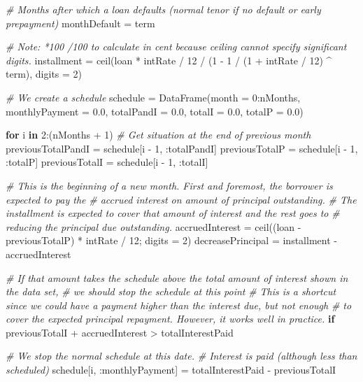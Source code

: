 \documentclass[11pt,]{report}
\newenvironment{Shaded}{\begin{snugshade}}{\end{snugshade}}
\newcommand{\CommentTok}[1]{\textcolor[rgb]{0.56,0.35,0.01}{\textit{#1}}}
\newcommand{\FloatTok}[1]{\textcolor[rgb]{0.00,0.00,0.81}{#1}}
\newcommand{\KeywordTok}[1]{\textcolor[rgb]{0.13,0.29,0.53}{\textbf{#1}}}
\newcommand{\NormalTok}[1]{#1}
\begin{document}
\begin{Shaded}
\begin{Highlighting}[numbers=left,,]
  \CommentTok{# Months after which a loan defaults (normal tenor if no default or early prepayment)}
\NormalTok{  monthDefault = term}

  \CommentTok{# Note: *100 /100 to calculate in cent because ceiling cannot specify significant digits.}
\NormalTok{  installment = ceil(loan * intRate / }\FloatTok{12}\NormalTok{ / (}\FloatTok{1}\NormalTok{ - }\FloatTok{1}\NormalTok{ / (}\FloatTok{1}\NormalTok{ + intRate / }\FloatTok{12}\NormalTok{) ^ term), digits = }\FloatTok{2}\NormalTok{)}

  \CommentTok{# We create a schedule}
\NormalTok{  schedule = DataFrame(month = }\FloatTok{0}\NormalTok{:nMonths, monthlyPayment = }\FloatTok{0.0}\NormalTok{,}
\NormalTok{                       totalPandI = }\FloatTok{0.0}\NormalTok{, totalI = }\FloatTok{0.0}\NormalTok{, totalP = }\FloatTok{0.0}\NormalTok{)}

  \KeywordTok{for}\NormalTok{ i }\KeywordTok{in} \FloatTok{2}\NormalTok{:(nMonths + }\FloatTok{1}\NormalTok{)}
    \CommentTok{# Get situation at the end of previous month}
\NormalTok{    previousTotalPandI = schedule[i - }\FloatTok{1}\NormalTok{, :totalPandI]}
\NormalTok{    previousTotalP     = schedule[i - }\FloatTok{1}\NormalTok{, :totalP]}
\NormalTok{    previousTotalI     = schedule[i - }\FloatTok{1}\NormalTok{, :totalI]}

    \CommentTok{# This is the beginning of a new month. First and foremost, the borrower is expected to pay the}
    \CommentTok{# accrued interest on amount of principal outstanding.}
    \CommentTok{# The installment is expected to cover that amount of interest and the rest goes to}
    \CommentTok{# reducing the principal due outstanding.}
\NormalTok{    accruedInterest = ceil((loan - previousTotalP) * intRate / }\FloatTok{12}\NormalTok{; digits = }\FloatTok{2}\NormalTok{)}
\NormalTok{    decreasePrincipal = installment - accruedInterest}

    \CommentTok{# If that amount takes the schedule above the total amount of interest shown in the data set,}
    \CommentTok{# we should stop the schedule at this point}
    \CommentTok{# This is a shortcut since we could have a payment higher than the interest due, but not enough}
    \CommentTok{# to cover the expected principal repayment. However, it works well in practice.}
    \KeywordTok{if}\NormalTok{ previousTotalI + accruedInterest > totalInterestPaid}

      \CommentTok{# We stop the normal schedule at this date.}
      \CommentTok{# Interest is paid (although less than scheduled)}
\NormalTok{      schedule[i, :monthlyPayment] = totalInterestPaid - previousTotalI}


\end{Highlighting}
\end{Shaded}
\end{document}
